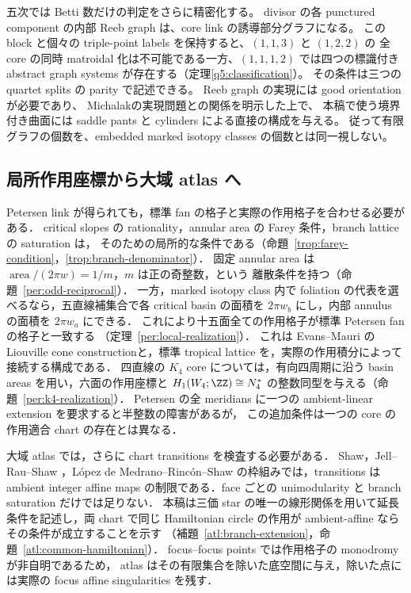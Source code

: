 五次では Betti 数だけの判定をさらに精密化する。
divisor の各 punctured component の内部 Reeb graph は、core link の誘導部分グラフになる。
この block と個々の triple-point labels を保持すると、$(1,1,3)$ と $(1,2,2)$ の
全 core の同時 matroidal 化は不可能である一方、$(1,1,1,2)$ では四つの標識付き
abstract graph systems が存在する（定理\ref{q5:classification}）。
その条件は三つの quartet splits の parity で記述できる。
Reeb graph の実現には good orientation が必要であり、
Michalak\cite[Definition 2.2, Theorem 5.6]{MichalakReeb}の実現問題との関係を明示した上で、
本稿で使う境界付き曲面には saddle pants と cylinders による直接の構成を与える。
従って有限グラフの個数を、embedded marked isotopy classes の個数とは同一視しない。


\subsection{局所作用座標から大域 atlas へ}

Petersen link が得られても，標準 fan の格子と実際の作用格子を合わせる必要がある．
critical slopes の rationality，annular area の Farey 条件，branch lattice の saturation は，
そのための局所的な条件である（命題~\ref{trop:farey-condition}，\ref{trop:branch-denominator}）．
固定 annular area は $\operatorname{area}/(2\pi w)=1/m$，$m$ は正の奇整数，という
離散条件を持つ（命題~\ref{per:odd-reciprocal}）．
一方，marked isotopy class 内で foliation の代表を選べるなら，五直線補集合で各 critical
basin の面積を $2\pi w_b$ にし，内部 annulus の面積を $2\pi w_a$ にできる．
これにより十五面全ての作用格子が標準 Petersen fan の格子と一致する
（定理~\ref{per:local-realization}）．
これは Evans--Mauri の Liouville cone construction\cite{EM}と，標準 tropical lattice
\cite{GKM}を，実際の作用積分によって接続する構成である．
四直線の $K_4$ core については，有向四周期に沿う basin areas を用い，六面の作用座標と
$H_1(W_4;\ZZ)\cong N_4^*$ の整数同型を与える（命題~\ref{per:k4-realization}）．
Petersen の全 meridians に一つの ambient-linear extension を要求すると半整数の障害があるが，
この追加条件は一つの core の作用適合 chart の存在とは異なる．

大域 atlas では，さらに chart transitions を検査する必要がある．
Shaw\cite[Definition~3.1]{ShawSurfaces}，Jell--Rau--Shaw
\cite[Definitions~2.1, 3.1, 5.1]{JellRauShaw}，L\'opez de Medrano--Rinc\'on--Shaw
\cite[Definitions~2.2--2.4]{LRSChern}の枠組みでは，transitions は ambient integer affine maps
の制限である．face ごとの unimodularity と branch saturation だけでは足りない．
本稿は三価 star の唯一の線形関係を用いて延長条件を記述し，両 chart で同じ Hamiltonian
circle の作用が ambient-affine ならその条件が成立することを示す
（補題~\ref{atl:branch-extension}，命題~\ref{atl:common-hamiltonian}）．
focus--focus points では作用格子の monodromy が非自明である\cite[Remark~3.1]{VuNgoc}ため，
atlas はその有限集合を除いた底空間に与え，除いた点には実際の focus affine singularities を残す．

